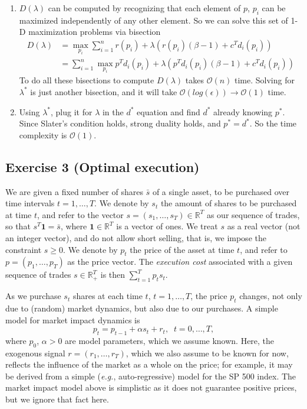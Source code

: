 \documentclass[11pt]{article}
\begin{document}
\begin{solution}
\begin{enumerate}
\item $D(\lambda)$ can be computed by recognizing that each element of $p$, $p_i$ can be maximized independently of any other element. So we can solve this set of 1-D maximization problems via bisection
    \begin{align*}
        D(\lambda) &= \max_{p_i} \sum_{i=1}^n r(p_i) + \lambda (r(p_i)(\beta - 1) + c^T d_i(p_i)) \\
        &= \sum_{i=1}^n \max_{p_i} p^T d_i(p_i) + \lambda (p^T d_i(p_i)(\beta - 1) + c^T d_i(p_i))
    \end{align*}
    To do all these bisections to compute $D(\lambda)$ takes $\mathcal{O}(n)$ time. Solving for $\lambda^*$ is just another bisection, and it will take $\mathcal{O}(log(\epsilon)) \rightarrow \mathcal{O}(1)$ time.

\item Using $\lambda^*$, plug it for $\lambda$ in the $d^*$ equation and find $d^*$ already knowing $p^*$. Since Slater's condition holds, strong duality holds, and $p^* = d^*$. So the time complexity is $\mathcal{O}(1)$.
\end{enumerate}
\end{solution}

\newpage
\subsection*{Exercise 3 (Optimal execution)}

We are given a fixed number of shares $\bar{s}$ of a single asset, to be purchased over time intervals $t=1,\ldots,T$.  We denote by $s_t$ the amount of shares to be purchased at time $t$, and refer to
the vector $s=(s_1,\ldots,s_T) \in \mathbb{R}^{T}$ as our sequence of trades, so that $s^T \mathbf{1} = \bar{s}$, where $\mathbf{1} \in \mathbb{R}^{T}$ is a vector of ones.  We treat $s$ as a real vector (not an integer vector), and do not allow short selling, that is, we impose the constraint $s \ge 0$. We denote by $p_t$ the price of the asset at time $t$, and refer to $p = (p_1,\ldots,p_T)$ as the price vector.  The {\em execution cost} associated with a given sequence of trades $s \in \mathbb{R}_{+}^{T}$ is then $\sum_{t=1}^T  p_t s_t$.

As we purchase $s_t$ shares at each time $t$, $t=1,\ldots,T$, the price $p_t$ changes, not only due to (random) market dynamics, but also due to our purchases. A simple model for market impact dynamics is
\begin{equation}\label{eq:price-dyn}
p_t = p_{t-1} + \alpha s_t + r_t, \;\; t=0,\ldots,T,
\end{equation}
where $p_0$, $\alpha>0$ are model parameters, which we assume known. Here, the exogenous signal $r = (r_1,\ldots,r_T)$, which we also assume to be known for now, reflects the influence of the market as a whole on the price; for example, it may be derived from a simple ({\em e.\/g.}, auto-regressive) model for the SP 500 index. The market impact model above is simplistic as it does not guarantee positive prices, but we ignore that fact here.
\end{document}
